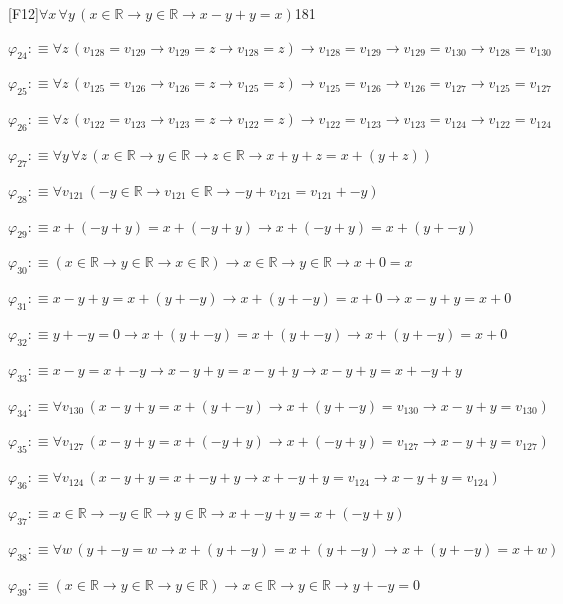 \begin{fullproof}{[F12]}{$\forall x\,\forall y\,(x \in \mathbb{R} \to y \in \mathbb{R} \to x - y + y = x)$}{181}
\begin{abbrevlist}
\item $\varphi_{24} :\equiv \forall z\,(v_{128} = v_{129} \to v_{129} = z \to v_{128} = z) \to v_{128} = v_{129} \to v_{129} = v_{130} \to v_{128} = v_{130}$
\item $\varphi_{25} :\equiv \forall z\,(v_{125} = v_{126} \to v_{126} = z \to v_{125} = z) \to v_{125} = v_{126} \to v_{126} = v_{127} \to v_{125} = v_{127}$
\item $\varphi_{26} :\equiv \forall z\,(v_{122} = v_{123} \to v_{123} = z \to v_{122} = z) \to v_{122} = v_{123} \to v_{123} = v_{124} \to v_{122} = v_{124}$
\item $\varphi_{27} :\equiv \forall y\,\forall z\,(x \in \mathbb{R} \to y \in \mathbb{R} \to z \in \mathbb{R} \to x + y + z = x + (y + z))$
\item $\varphi_{28} :\equiv \forall v_{121}\,(-y \in \mathbb{R} \to v_{121} \in \mathbb{R} \to -y + v_{121} = v_{121} + -y)$
\item $\varphi_{29} :\equiv x + (-y + y) = x + (-y + y) \to x + (-y + y) = x + (y + -y)$
\item $\varphi_{30} :\equiv (x \in \mathbb{R} \to y \in \mathbb{R} \to x \in \mathbb{R}) \to x \in \mathbb{R} \to y \in \mathbb{R} \to x + 0 = x$
\item $\varphi_{31} :\equiv x - y + y = x + (y + -y) \to x + (y + -y) = x + 0 \to x - y + y = x + 0$
\item $\varphi_{32} :\equiv y + -y = 0 \to x + (y + -y) = x + (y + -y) \to x + (y + -y) = x + 0$
\item $\varphi_{33} :\equiv x - y = x + -y \to x - y + y = x - y + y \to x - y + y = x + -y + y$
\item $\varphi_{34} :\equiv \forall v_{130}\,(x - y + y = x + (y + -y) \to x + (y + -y) = v_{130} \to x - y + y = v_{130})$
\item $\varphi_{35} :\equiv \forall v_{127}\,(x - y + y = x + (-y + y) \to x + (-y + y) = v_{127} \to x - y + y = v_{127})$
\item $\varphi_{36} :\equiv \forall v_{124}\,(x - y + y = x + -y + y \to x + -y + y = v_{124} \to x - y + y = v_{124})$
\item $\varphi_{37} :\equiv x \in \mathbb{R} \to -y \in \mathbb{R} \to y \in \mathbb{R} \to x + -y + y = x + (-y + y)$
\item $\varphi_{38} :\equiv \forall w\,(y + -y = w \to x + (y + -y) = x + (y + -y) \to x + (y + -y) = x + w)$
\item $\varphi_{39} :\equiv (x \in \mathbb{R} \to y \in \mathbb{R} \to y \in \mathbb{R}) \to x \in \mathbb{R} \to y \in \mathbb{R} \to y + -y = 0$

\end{abbrevlist}
\end{fullproof}
